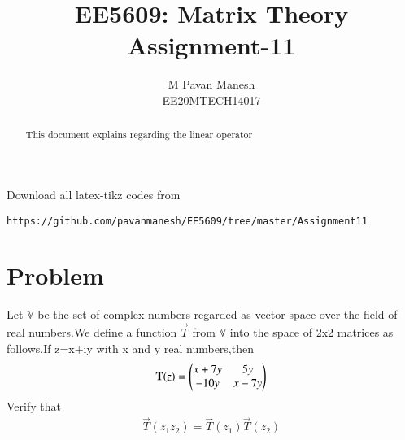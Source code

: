 \documentclass[journal,12pt,twocolumn]{IEEEtran}
\begin{document}
     \def\rightbox#1{\makebox[0in][r]{#1}}
     \def\centbox#1{\makebox[0in]{#1}}
     \def\topbox#1{\raisebox{-\baselineskip}[0in][0in]{#1}}
     \def\midbox#1{\raisebox{-0.5\baselineskip}[0in][0in]{#1}}
\vspace{3cm}
\title{EE5609: Matrix Theory\\
          Assignment-11\\}
\author{M Pavan Manesh\\
EE20MTECH14017 }
\maketitle
\newpage
\bigskip
\renewcommand{\thefigure}{\theenumi}
\renewcommand{\thetable}{\theenumi}
\begin{abstract}
This document explains regarding the linear operator
\end{abstract}
Download all latex-tikz codes from 
%
\begin{lstlisting}
https://github.com/pavanmanesh/EE5609/tree/master/Assignment11
\end{lstlisting}
%
\section{Problem}
Let $\mathbb{V}$ be the set of complex numbers regarded as vector space over the field of real numbers.We define a function $\vec{T}$ from $\mathbb{V}$ into the space of 2x2 matrices as follows.If z=x+iy with x and y real numbers,then 
\begin{align}
    \mathbf{T}(z)=\begin{pmatrix}x+7y&5y\\-10y&x-7y\end{pmatrix}\label{eq:1}
\end{align}
Verify that
\begin{align}
    \vec{T}(z_1z_2)=\vec{T}(z_1)\vec{T}(z_2) \label{eq:1}
\end{align}
\end{document}
